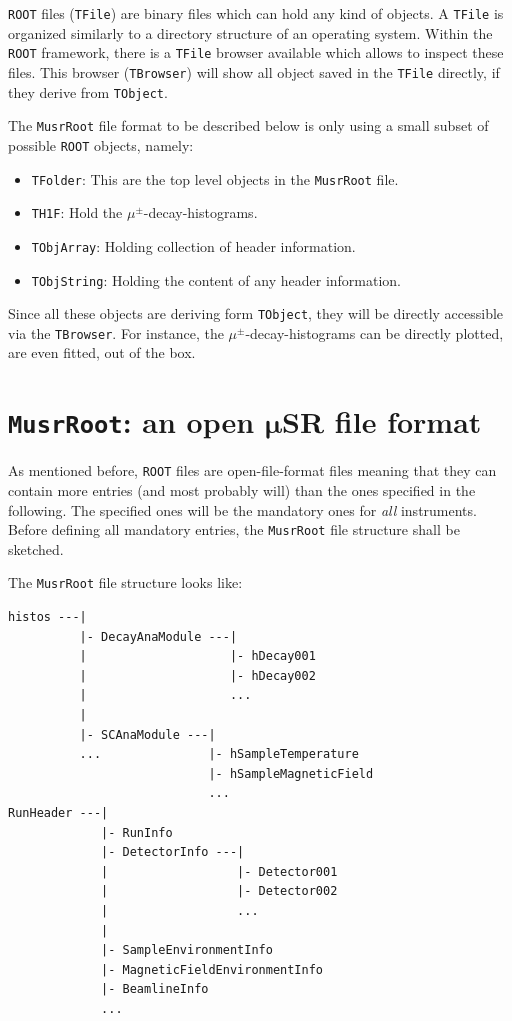 \documentclass[twoside]{article}
\newcommand{\musrroot}{\texttt{MusrRoot}\xspace}
\newcommand{\rootcern}{\texttt{ROOT}\xspace}
\newcommand{\tbrowser}{\texttt{TBrowser}\xspace}
\newcommand{\tfile}{\texttt{TFile}\xspace}
\newcommand{\tfolder}{\texttt{TFolder}\xspace}
\newcommand{\tobject}{\texttt{TObject}\xspace}
\newcommand{\tobjarray}{\texttt{TObjArray}\xspace}
\newcommand{\tobjstring}{\texttt{TObjString}\xspace}
\newcommand{\thonef}{\texttt{TH1F}\xspace}
\begin{document}
\rootcern files (\tfile) are binary files which can hold any kind of objects. A \tfile is organized similarly to a directory structure of an operating system. Within the \rootcern framework, there is a \tfile browser available which allows to inspect these files. This browser (\tbrowser) will show all object saved in the \tfile directly, if they derive from \tobject.

The \musrroot file format to be described below is only using a small subset of possible \rootcern objects, namely:

\begin{itemize}
 \item \tfolder: This are the top level objects in the \musrroot file.
 \item \thonef: Hold the $\mu^\pm$-decay-histograms.
 \item \tobjarray: Holding collection of header information.
 \item \tobjstring: Holding the content of any header information.
\end{itemize}

\noindent Since all these objects are deriving form \tobject, they will be directly accessible via the \tbrowser. For instance, the $\mu^\pm$-decay-histograms can be directly plotted, are even fitted, out of the box.

\cleardoublepage

\section{\musrroot: an open $\boldsymbol{\mu}$SR file format}

As mentioned before, \rootcern files are open-file-format files meaning that they can contain more entries (and most probably will) than the ones specified in the following. The specified ones will be the mandatory ones for \emph{all} instruments. Before defining all mandatory entries, the \musrroot file structure shall be sketched.

\noindent The \musrroot file structure looks like:

\begin{verbatim}
histos ---|
          |- DecayAnaModule ---|
          |                    |- hDecay001
          |                    |- hDecay002
          |                    ...
          |
          |- SCAnaModule ---|
          ...               |- hSampleTemperature
                            |- hSampleMagneticField
                            ...
RunHeader ---|
             |- RunInfo
             |- DetectorInfo ---|
             |                  |- Detector001
             |                  |- Detector002
             |                  ...
             |
             |- SampleEnvironmentInfo
             |- MagneticFieldEnvironmentInfo
             |- BeamlineInfo
             ...
\end{verbatim}
\end{document}
